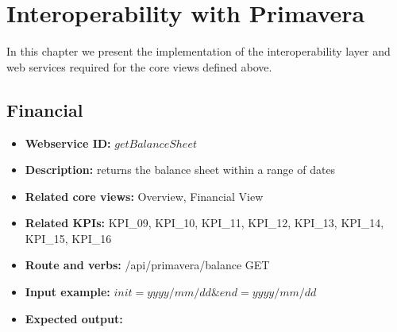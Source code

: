 \documentclass[a4paper]{article}
\begin{document}
\newpage

\section{Interoperability with Primavera}

In this chapter we present the implementation of the interoperability layer and
web services required for the core views defined above.


\subsection{Financial}

\begin{itemize}
  \item \textbf{Webservice ID:} $getBalanceSheet$
  \item \textbf{Description:} returns the balance sheet within a range of dates
  \item \textbf{Related core views:} Overview, Financial View
  \item \textbf{Related KPIs:} KPI\_09, KPI\_10, KPI\_11,  KPI\_12, KPI\_13, KPI\_14, KPI\_15, KPI\_16
  \item \textbf{Route and verbs:} /api/primavera/balance GET
  \item \textbf{Input example:} $init=yyyy/mm/dd\&end=yyyy/mm/dd$
  \item \textbf{Expected output:} 

  
\end{itemize}
\end{document}
